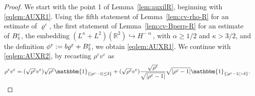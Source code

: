 \documentclass[11pt,reqno]{amsart}
\def \R{{\mathbb{R}}}
\newcommand{\myparallel}{{\mkern3mu\vphantom{\perp}\vrule depth 0pt\mkern2mu\vrule depth 0pt\mkern3mu}}
\begin{document}
\begin{proof}
  We start with the point 1 of Lemma~\ref{lem:auxilR}, beginning with \eqref{eqlem:AUXR1}. Using the fifth statement of Lemma~\ref{lem:cv-rho-R} for an estimate of $\varrho^\varepsilon$,  the first statement of Lemma~\ref{lem:cv-Bperp-R} for an estimate of $B_\myparallel^\varepsilon $, the embedding $(L^\kappa + L^2)(\R^2) \hookrightarrow H^{-\upalpha}$, with $\alpha \geq 1/2$ and $\kappa >3/2$, and the definition $\phi^\varepsilon := b \varrho^\varepsilon + B_\myparallel^\varepsilon $,  we obtain \eqref{eqlem:AUXR1}. We continue with \eqref{eqlem:AUXR2}, by recasting $\rho^\varepsilon v^\varepsilon$ as
\begin{equation}
 \label{eqn:AUXR1} 
 \rho^\varepsilon v^\varepsilon =(\sqrt{\rho^\varepsilon} v^\varepsilon) \sqrt{\rho^\varepsilon}
 \mathbbm{1}_{\{|\rho^\varepsilon-1|\leq \delta\}} + (\sqrt{\rho^\varepsilon} v^\varepsilon)
 \frac{\sqrt{\rho^\varepsilon}}{\sqrt{|\rho^\varepsilon-1|}}\sqrt{|\rho^\varepsilon-1|}
 \mathbbm{1}_{\{|\rho^\varepsilon-1|> \delta\}}. 
\end{equation}

\end{proof}
\end{document}

